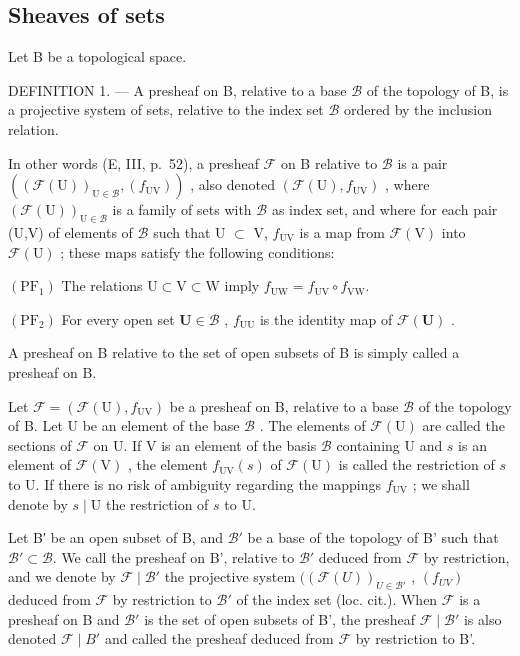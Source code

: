 \subsection{Sheaves of sets}

Let B be a topological space.

DEFINITION 1. --- A presheaf on B, relative to a base \(\mathcal{B}\) of the topology of B, is a projective system of sets, relative to the index set \(\mathcal{B}\) ordered by the inclusion relation.

In other words (E, III, p.~52), a presheaf \(\mathcal{F}\) on B relative to \(\mathcal{B}\) is a pair \(((\mathcal{F}(\mathrm{U}))_{\mathrm{U}\in\mathcal{B}},(f_{\mathrm{UV}}))\) , also denoted \((\mathcal{F}(\mathrm{U}),f_{\mathrm{UV}})\) , where \((\mathcal{F}(\mathrm{U}))_{\mathrm{U}\in\mathcal{B}}\) is a family of sets with \(\mathcal{B}\) as index set, and where for each pair (U,V) of elements of \(\mathcal{B}\) such that U \(\subset\) V, \(f_{\mathrm{UV}}\) is a map from \(\mathcal{F}(\mathrm{V})\) into \(\mathcal{F}(\mathrm{U})\) ; these maps satisfy the following conditions:

\((\mathrm{PF}_{1})\) The relations \(\mathrm{U}\subset \mathrm{V}\subset \mathrm{W}\) imply \(f_{\mathrm{UW}} = f_{\mathrm{UV}}\circ f_{\mathrm{VW}}\).

\((\mathrm{PF}_2)\) For every open set \(\mathbf{U} \in \mathcal{B}\) , \(f_{\mathrm{UU}}\) is the identity map of \(\mathcal{F}(\mathbf{U})\) .

A presheaf on B relative to the set of open subsets of B is simply called a presheaf on B.

Let \(\mathcal{F} = (\mathcal{F}(\mathrm{U}), f_{\mathrm{UV}})\) be a presheaf on B, relative to a base \(\mathcal{B}\) of the topology of B. Let U be an element of the base \(\mathcal{B}\) . The elements of \(\mathcal{F}(\mathrm{U})\) are called the sections of \(\mathcal{F}\) on U. If V is an element of the basis \(\mathcal{B}\) containing U and \(s\) is an element of \(\mathcal{F}(\mathrm{V})\) , the element \(f_{\mathrm{UV}}(s)\) of \(\mathcal{F}(\mathrm{U})\) is called the restriction of \(s\) to U. If there is no risk of ambiguity regarding the mappings \(f_{\mathrm{UV}}\) ; we shall denote by \(s \mid \mathrm{U}\) the restriction of \(s\) to U.

Let B′ be an open subset of B, and \(\mathcal{B}'\) be a base of the topology of B' such that \(\mathcal{B}' \subset \mathcal{B}\). We call the presheaf on B', relative to \(\mathcal{B}'\) deduced from \(\mathcal{F}\) by restriction, and we denote by \(\mathcal{F} \mid \mathcal{B}'\) the projective system \(((\mathcal{F}(U))_{U \in \mathcal{B}'}\) , \((f_{UV})\) deduced from \(\mathcal{F}\) by restriction to \(\mathcal{B}'\) of the index set (loc. cit.). When \(\mathcal{F}\) is a presheaf on B and \(\mathcal{B}'\) is the set of open subsets of B', the presheaf \(\mathcal{F} \mid \mathcal{B}'\) is also denoted \(\mathcal{F} \mid B'\) and called the presheaf deduced from \(\mathcal{F}\) by restriction to B'.

